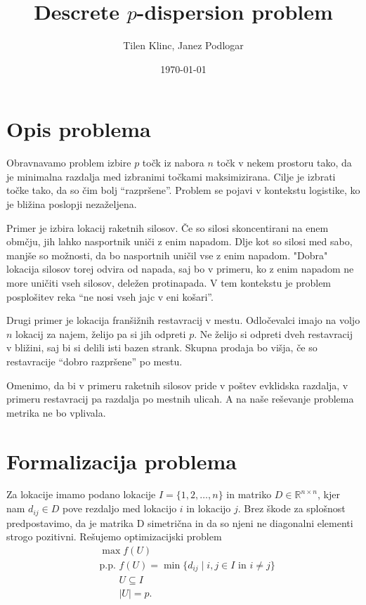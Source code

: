 \documentclass{article}
\title{Descrete $p$-dispersion problem}
\author{Tilen Klinc, Janez Podlogar}
\date{\today}
\begin{document}
    
\maketitle

\section{Opis problema}

Obravnavamo problem izbire $ p $ točk iz nabora $ n $ točk v nekem prostoru
tako, da je minimalna razdalja med izbranimi točkami maksimizirana. Cilje je
izbrati točke tako, da so čim bolj ``razpršene''. Problem se pojavi v kontekstu
logistike, ko je bližina poslopji nezaželjena.


Primer je izbira lokacij raketnih silosov. Če so silosi skoncentirani na enem
obmčju, jih lahko nasportnik uniči z enim napadom. Dlje kot so silosi med sabo,
manjše so možnosti, da bo nasportnih uničil vse z enim napadom. "Dobra" lokacija
silosov torej odvira od napada, saj bo v primeru, ko z enim napadom ne more uničiti
vseh silosov, deležen protinapada. V tem kontekstu je problem posplošitev reka 
``ne nosi vseh jajc v eni košari''.

Drugi primer je lokacija franšižnih restavracij v mestu. Odločevalci imajo na voljo $ n $
lokacij za najem, želijo pa si jih odpreti $ p $. Ne želijo si odpreti dveh restavracij
v bližini, saj bi si delili isti bazen strank. Skupna prodaja bo višja, če so restavracije
``dobro razpršene'' po mestu.

Omenimo, da bi v primeru raketnih silosov pride v poštev evklidska razdalja, v primeru
restavracij pa razdalja po mestnih ulicah. A na naše reševanje problema metrika ne bo 
vplivala.

\section{Formalizacija problema}

Za lokacije imamo podano lokacije $ I = \{ 1, 2, \ldots, n \} $ in matriko $ D \in 
\mathbb{R}^{n \times n} $, kjer nam $ d_{ij} \in D $ pove rezdaljo med lokacijo $ i $
in lokacijo $ j $. Brez škode za splošnost predpostavimo, da je matrika D simetrična in
da so njeni ne diagonalni elementi strogo pozitivni. Rešujemo optimizacijski problem
\begin{align*}
    & \max f(U) \\
    & \text{p.p. } f(U) = \min \{ d_{ij} \mid i,j \in I \text{ in } i \neq j \} \\
    & \qquad U \subseteq I \\
    & \qquad |U| = p .
\end{align*}
\end{document}
